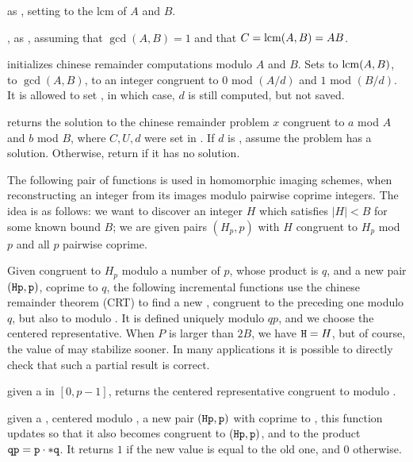  as
, setting  to the lcm of $A$ and $B$.

, as
, assuming that $\gcd(A,B) = 1$ and that $C = {\rm lcm}(A,B) = AB$.

initializes chinese remainder computations modulo $A$ and $B$. Sets
 to ${\rm lcm}(A,B)$,  to $\gcd(A,B)$,
 to an integer congruent to $0$ mod $(A/d)$ and $1$ mod $(B/d)$.
It is allowed to set , in which case, $d$ is still
computed, but not saved.

 returns
the solution to the chinese remainder problem $x$ congruent
to $a$ mod $A$ and $b$ mod $B$, where $C, U, d$ were set in
. If $d$ is , assume the problem has a
solution. Otherwise, return  if it has no solution.

\medskip

The following pair of functions is used in homomorphic imaging schemes,
when reconstructing an integer from its images modulo pairwise coprime
integers. The idea is as follows: we want to discover an integer $H$ which
satisfies $|H| < B$ for some known bound $B$; we are given pairs $(H_p, p)$
with $H$ congruent to $H_p$ mod $p$ and all $p$ pairwise coprime.

Given  congruent to $H_p$ modulo a number of $p$, whose product is
$q$, and a new pair $({\tt Hp}, {\tt p})$,  coprime to $q$, the
following incremental functions use the chinese remainder theorem (CRT) to
find a new , congruent to the preceding one modulo $q$, but also to
 modulo . It is defined uniquely modulo $qp$, and we choose
the centered representative. When $P$ is larger than $2B$, we have ${\tt H} =
H$, but of course, the value of  may stabilize sooner. In many
applications it is possible to directly check that such a partial result is
correct.

 given a   in
$[0, p-1]$, returns the centered representative  congruent to 
modulo .

given a  , centered modulo , a new pair $({\tt Hp},
{\tt p})$ with  coprime to , this function updates  so
that it also becomes congruent to $({\tt Hp}, {\tt p})$, and  to the
product${\tt qp} = {\tt p} \cdot {\tt *q}$. It returns $1$ if the new value
is equal to the old one, and $0$ otherwise.

